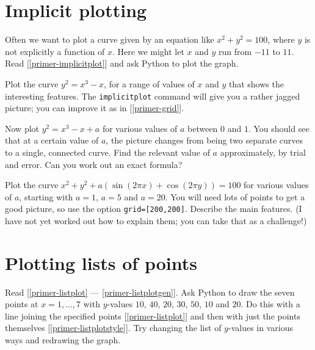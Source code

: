 \documentclass[a4paper,10pt]{amsbook}
\begin{document}
\section{Implicit plotting}


Often we want to plot a curve given by an equation like
$x^2+y^2=100$, where $y$ is not explicitly a function of
$x$.  Here we might let $x$ and $y$ run from $-11$ to $11$.
Read [\ref{primer-implicitplot}] and ask Python to plot the
graph. 

\begin{exercise}
 Plot the curve $y^2=x^3-x$, for a range of values of $x$
 and $y$ that shows the interesting features.  The
 \verb~implicitplot~ command will give you a rather jagged
 picture; you can improve it as in [\ref{primer-grid}].

 Now plot $y^2=x^3-x+a$ for various values of $a$ between
 $0$ and $1$.  You should see that at a certain value of
 $a$, the picture changes from being two separate curves to
 a single, connected curve.  Find the relevant value of $a$
 approximately, by trial and error.  Can you work out an
 exact formula? 
\end{exercise}

\begin{exercise}
 Plot the curve $x^2+y^2+a(\sin(2\pi x)+\cos(2\pi y))=100$ for
 various values of $a$, starting with $a=1$, $a=5$ and
 $a=20$.  You will need lots of points to get a good
 picture, so use the option \verb~grid=[200,200]~.  Describe
 the main features.  (I have not yet  worked out how to
 explain them; you can take that as a challenge!) 
\end{exercise}

\section{Plotting lists of points}

\begin{exercise}\label{ex-listplot}
 Read [\ref{primer-listplot} --- \ref{primer-listplotgen}].  Ask Python
 to draw the seven points at $x=1,\dotsc,7$ with $y$-values
 $10$, $40$, $20$, $30$, $50$, $10$ and $20$.  Do this with
 a line joining the specified points [\ref{primer-listplot}]
 and then with just the points themselves
 [\ref{primer-listplotstyle}].  Try changing the list of
 $y$-values in various ways and redrawing the graph.
\end{exercise}
\end{document}
